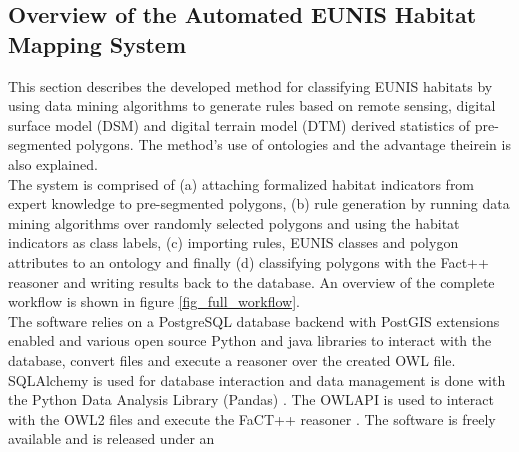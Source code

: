 \documentclass[authoryear, review,12pt,number]{elsarticle}
\begin{document}
\subsection{Overview of the Automated EUNIS Habitat Mapping System}
This section describes the developed method for classifying EUNIS habitats by
using data mining algorithms to generate rules based on remote sensing, digital
surface model (DSM) and digital terrain model (DTM) derived statistics of
pre-segmented polygons. The method's use of ontologies and the advantage
theirein is also explained.\\ The system is comprised of (a) attaching
formalized habitat indicators from expert knowledge to pre-segmented polygons,
(b) rule generation by running data mining algorithms over randomly selected
polygons and using the habitat indicators as class labels, (c) importing rules,
EUNIS classes and polygon attributes to an ontology and finally (d) classifying
polygons with the Fact++ reasoner \citep{Tsarkov2006} and writing results back
to the database. An overview of the complete workflow is shown in figure
\ref{fig_full_workflow}.\\
The software relies on a PostgreSQL database backend with PostGIS extensions
enabled and various open source Python and java libraries to interact with the
database, convert files and execute a reasoner over the created OWL file.
SQLAlchemy is used for database interaction and data management is done with
the Python Data Analysis Library (Pandas) \citep{McKinney2010}. The OWLAPI is
used to interact with the OWL2 files and execute the FaCT++ reasoner
\citep{Tsarkov2006}. The software is freely available and is released under an
\end{document}
